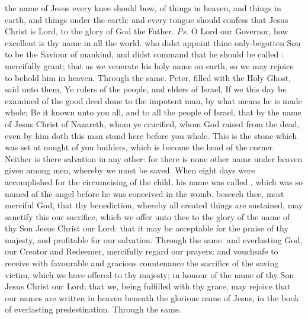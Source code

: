 \introit
{} the name of Jesus every knee should bow, of things in heaven, and things in earth, and things under the earth: and every tongue should confess that Jesus Christ is Lord, to the glory of God the Father. \textit{Ps.} O Lord our Governor, how excellent is thy name in all the world.
\collect
{} who didst appoint thine only-begotten Son to be the Saviour of mankind, and didst command that he should be called : mercifully grant; that as we venerate his holy name on earth, so we may rejoice to behold him in heaven. Through the same.
 Peter, filled with the Holy Ghost, said unto them, Ye rulers of the people, and elders of Israel, If we this day be examined of the good deed done to the impotent man, by what means he is made whole; Be it known unto you all, and to all the people of Israel, that by the name of Jesus Christ of Nazareth, whom ye crucified, whom God raised from the dead, even by him doth this man stand here before you whole. This is the stone which was set at nought of you builders, which is become the head of the corner. Neither is there salvation in any other: for there is none other name under heaven given among men, whereby we must be saved.
 When eight days were accomplished for the circumcising of the child, his name was called , which was so named of the angel before he was conceived in the womb.
\secret
{} beseech thee, most merciful God, that thy benediction, whereby all created things are sustained, may sanctify this our sacrifice, which we offer unto thee to the glory of the name of thy Son Jesus Christ our Lord: that it may be acceptable for the praise of thy majesty, and profitable for our salvation. Through the same.
\postcommunion
{} and everlasting God, our Creator and Redeemer, mercifully regard our prayers: and vouchsafe to receive with favourable and gracious countenance the sacrifice of the saving victim, which we have offered to thy majesty; in honour of the name of thy Son Jesus Christ our Lord; that we, being fulfilled with thy grace, may rejoice that our names are written in heaven beneath the glorious name of Jesus, in the book of everlasting predestination. Through the same.

